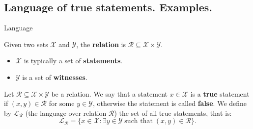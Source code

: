\documentclass{zkdl-presentation-template}
\begin{document}
    \subsection{Language of true statements. Examples.}
    \begin{frame}{Language}
        \begin{definition}[Relation]
            Given two sets $\mathcal{X}$ and $\mathcal{Y}$, the \textbf{relation} is $\mathcal{R} \subseteq \mathcal{X} \times \mathcal{Y}$.
            \begin{itemize}
                \item $\mathcal{X}$ is typically a set of \textbf{statements}.
                \item $\mathcal{Y}$ is a set of \textbf{witnesses}.
            \end{itemize}
        \end{definition}

        \begin{definition}
            Let $\mathcal{R} \subseteq \mathcal{X} \times \mathcal{Y}$ be a relation. We say that a statement $x \in \mathcal{X}$ is a \textbf{true} statement if $(x,y) \in \mathcal{R}$ for some $y \in \mathcal{Y}$, otherwise the statement is called \textbf{false}. We define by $\mathcal{L}_{\mathcal{R}}$ (the language over relation $\mathcal{R}$) the set of all true statements, that is:
            \begin{equation*}
                \mathcal{L}_{\mathcal{R}} = \{ x \in \mathcal{X}: \exists y \in \mathcal{Y} \; \text{such that} \; (x,y) \in \mathcal{R} \}.
            \end{equation*}
        \end{definition}
    \end{frame}
\end{document}

